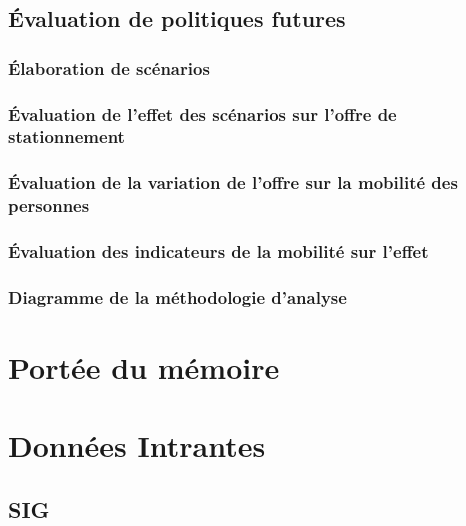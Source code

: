 \subsection{Évaluation de politiques futures}
  \subsubsection{Élaboration de scénarios}
  \subsubsection{Évaluation de l'effet des scénarios sur l'offre de stationnement}
  \subsubsection{Évaluation de la variation de l'offre sur la mobilité des personnes}
  \subsubsection{Évaluation des indicateurs de la mobilité sur l'effet}
  \subsubsection{Diagramme de la méthodologie d'analyse}
\section{Portée du mémoire}
\section{Données Intrantes}
  \subsection{\ac{SIG}}
